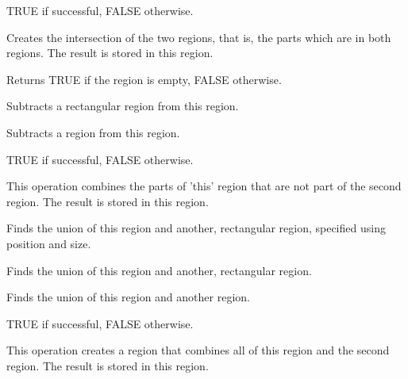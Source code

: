 
TRUE if successful, FALSE otherwise.


Creates the intersection of the two regions, that is, the parts which are in both regions. The result
is stored in this region.

\label{wxregionisempty}



Returns TRUE if the region is empty, FALSE otherwise.


Subtracts a rectangular region from this region.


Subtracts a region from this region.


TRUE if successful, FALSE otherwise.


This operation combines the parts of 'this' region that are not part of the second region.
The result is stored in this region.

\label{wxregionunion}


Finds the union of this region and another, rectangular region, specified using position and size.


Finds the union of this region and another, rectangular region.


Finds the union of this region and another region.


TRUE if successful, FALSE otherwise.


This operation creates a region that combines all of this region and the second region.
The result is stored in this region.

\label{wxregionxor}

